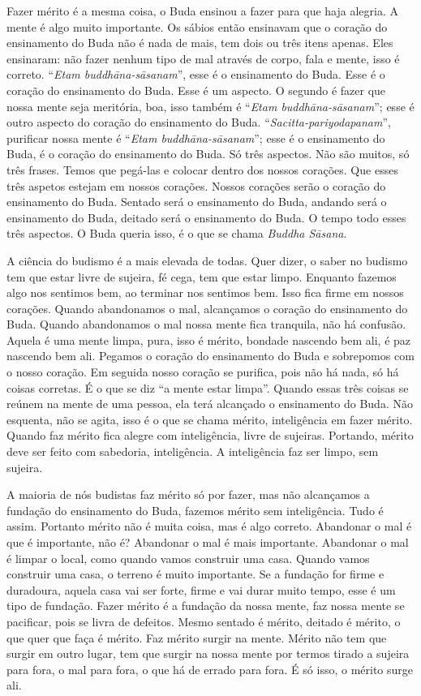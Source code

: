 Fazer mérito é a mesma coisa, o Buda ensinou a fazer para que haja
alegria. A mente é algo muito importante. Os sábios então ensinavam que
o coração do ensinamento do Buda não é nada de mais, tem dois ou três
itens apenas. Eles ensinaram: não fazer nenhum tipo de mal através de
corpo, fala e mente, isso é correto. “\textit{Etam
buddh\=ana-s\=asanam}”, esse é o ensinamento do Buda. Esse é o coração
do ensinamento do Buda. Esse é um aspecto. O segundo é fazer que nossa
mente seja meritória, boa, isso também é “\textit{Etam
buddh\=ana-s\=asanam}”; esse é outro aspecto do coração do ensinamento
do Buda. “\textit{Sacitta-pariyodapanam}”, purificar nossa mente é
“\textit{Etam buddh\=ana-s\=asanam}”; esse é o ensinamento do Buda, é o
coração do ensinamento do Buda. Só três aspectos. Não são muitos, só
três frases. Temos que pegá-las e colocar dentro dos nossos corações.
Que esses três aspetos estejam em nossos corações. Nossos corações
serão o coração do ensinamento do Buda. Sentado será o ensinamento do
Buda, andando será o ensinamento do Buda, deitado será o ensinamento do
Buda. O tempo todo esses três aspectos. O Buda queria isso, é o que se
chama \textit{Buddha S\=asana}. 

A ciência do budismo é a mais elevada de todas. Quer dizer, o saber
no budismo tem que estar livre de sujeira, fé cega, tem que estar
limpo. Enquanto fazemos algo nos sentimos bem, ao terminar nos sentimos
bem. Isso fica firme em nossos corações. Quando abandonamos o mal,
alcançamos o coração do ensinamento do Buda. Quando abandonamos o mal
nossa mente fica tranquila, não há confusão. Aquela é uma mente limpa,
pura, isso é mérito, bondade nascendo bem ali, é paz nascendo bem ali.
Pegamos o coração do ensinamento do Buda e sobrepomos com o nosso
coração. Em seguida nosso coração se purifica, pois não há nada, só há
coisas corretas. É o que se diz “a mente estar limpa”. Quando essas
três coisas se reúnem na mente de uma pessoa, ela terá alcançado o
ensinamento do Buda. Não esquenta, não se agita, isso é o que se chama
mérito, inteligência em fazer mérito. Quando faz mérito fica alegre com
inteligência, livre de sujeiras. Portando, mérito deve ser feito com
sabedoria, inteligência. A inteligência faz ser limpo, sem sujeira. 

A maioria de nós budistas faz mérito só por fazer, mas não
alcançamos a fundação do ensinamento do Buda, fazemos mérito sem
inteligência. Tudo é assim. Portanto mérito não é muita coisa, mas é
algo correto. Abandonar o mal é que é importante, não é? Abandonar o
mal é mais importante. Abandonar o mal é limpar o local, como quando
vamos construir uma casa. Quando vamos construir uma casa, o terreno é
muito importante. Se a fundação for firme e duradoura, aquela casa vai
ser forte, firme e vai durar muito tempo, esse é um tipo de fundação.
Fazer mérito é a fundação da nossa mente, faz nossa mente se pacificar,
pois se livra de defeitos. Mesmo sentado é mérito, deitado é mérito, o
que quer que faça é mérito. Faz mérito surgir na mente. Mérito não tem
que surgir em outro lugar, tem que surgir na nossa mente por termos
tirado a sujeira para fora, o mal para fora, o que há de errado para
fora. É só isso, o mérito surge ali. 

